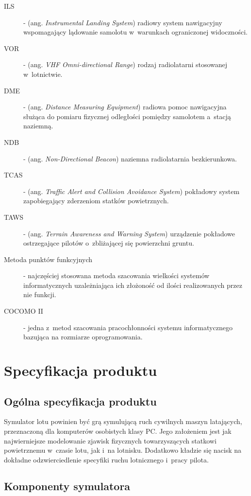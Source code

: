 \documentclass{mwrep}
\begin{document}
\begin{description}
\item[ILS] - (ang. \emph{Instrumental Landing System}) radiowy system nawigacyjny wspomagający lądowanie samolotu w~warunkach ograniczonej widoczności.
\item[VOR] - (ang. \emph{VHF Omni-directional Range}) rodzaj radiolatarni stosowanej w~lotnictwie.
\item[DME] - (ang. \emph{Distance Measuring Equipment}) radiowa pomoc nawigacyjna służąca do pomiaru fizycznej odległości pomiędzy samolotem a~stacją naziemną.
\item[NDB] - (ang. \emph{Non-Directional Beacon}) naziemna radiolatarnia bezkierunkowa.
\item[TCAS] - (ang. \emph{Traffic Alert and Collision Avoidance System}) pokładowy system zapobiegający zderzeniom statków powietrznych.
\item[TAWS] - (ang. \emph{Terrain Awareness and Warning System}) urządzenie pokładowe ostrzegające pilotów o~zbliżającej się powierzchni gruntu.
\item[Metoda punktów funkcyjnych] - najczęściej stosowana metoda szacowania wielkości systemów informatycznych uzależniająca ich złożoność od ilości realizowanych przez nie funkcji.
\item[COCOMO II] - jedna z~metod szacowania pracochłonności systemu informatycznego bazująca na rozmiarze oprogramowania.
\end{description}

\chapter{Specyfikacja produktu}

\section{Ogólna specyfikacja produktu}

Symulator lotu powinien być grą symulującą ruch cywilnych maszyn latających, przeznaczoną dla komputerów osobistych klasy PC. Jego założeniem jest jak najwierniejsze modelowanie zjawisk fizycznych towarzyszących statkowi powietrznemu w~czasie lotu, jak i~na lotnisku. Dodatkowo kładzie się nacisk na dokładne odzwierciedlenie specyfiki ruchu lotnicznego i~pracy pilota.

\section{Komponenty symulatora}
\end{document}
